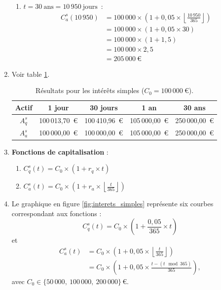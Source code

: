 \documentclass{article}
\begin{document}
\begin{enumerate}[label=\textbf{Q\arabic*.}]
\begin{enumerate}[label=(\alph*)]
        \item $t = 30\ \text{ans} = 10\,950\ \text{jours}$~: 
        \begin{align*}
        C_a^s(10\,950) &= 100\,000 \times \left(1 + 0,05 \times \left\lfloor \frac{10\,950}{365} \right\rfloor \right) \\
                 &= 100\,000 \times \left(1 + 0,05 \times 30 \right) \\
                 &= 100\,000 \times \left(1 + 1,5 \right) \\
                 &= 100\,000 \times 2,5 \\
                 &= \boxed{205\,000\ \text{€}}
        \end{align*}
    \end{enumerate}

    \item Voir table \ref{tab:simple_interest_results}.
    \begin{table}[h!]
        \centering
        \begin{tabular}{|c|c|c|c|c|}
        \hline
        \textbf{Actif} & \textbf{1 jour} & \textbf{30 jours} & \textbf{1 an} & \textbf{30 ans} \\
        \hline
        \( A_q^s \) & 100\,013,70\ € & 100\,410,96\ € & 105\,000,00\ € & 250\,000,00\ € \\
        \hline
        \( A_a^s \) & 100\,000,00\ € & 100\,000,00\ € & 105\,000,00\ € & 250\,000,00\ € \\
        \hline
        \end{tabular}
        \caption{Résultats pour les intérêts simples (\( C_0 = 100\,000\ \text{€} \)).}
        \label{tab:simple_interest_results}
    \end{table}

    \item \textbf{Fonctions de capitalisation} :
    \begin{enumerate}[label=(\alph*)]
        \item \( C_q^s(t) = C_0 \times \left(1 + r_q \times t\right) \)
        \item \( C_a^s(t) = C_0 \times \left(1 + r_a \times \left\lfloor\frac{t}{365}\right\rfloor\right) \)
    \end{enumerate}

    \item Le graphique en figure \ref{fig:interets_simples} représente six courbes correspondant aux fonctions :
        \[
            C_q^s(t) = C_0 \times \left(1 + \frac{0{,}05}{365} \times t\right)
        \]
        et
        \[
        \begin{aligned}
            C_a^s(t) &= C_0 \times \left(1 + 0{,}05 \times \left\lfloor\frac{t}{365}\right\rfloor\right) \\
                     &= C_0 \times \left(1 + 0{,}05 \times \frac{t - (t \!\!\!\mod 365)}{365}\right),
        \end{aligned}
        \]
        avec \( C_0 \in \bigl\{50\,000,\ 100\,000,\ 200\,000\bigr\}\,\text{€} \).


\end{enumerate}
\end{document}

